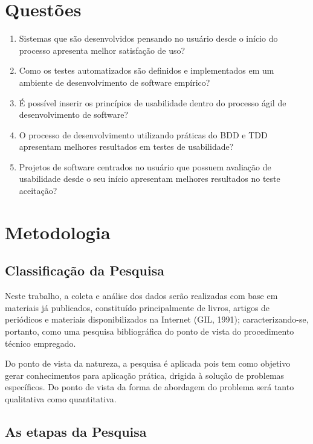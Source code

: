 	\section{Questões}
	\begin{enumerate}
	\item Sistemas que são desenvolvidos pensando no usuário desde o início do processo apresenta melhor  satisfação de uso?
	\item Como os testes automatizados são definidos e implementados em um ambiente de desenvolvimento de software empírico?
	\item É possível inserir os princípios de usabilidade dentro do processo ágil de desenvolvimento de software?
	\item O processo de desenvolvimento utilizando práticas do BDD e TDD apresentam melhores resultados em testes de usabilidade?
	\item Projetos de software centrados no usuário que possuem avaliação de usabilidade desde o seu início apresentam melhores resultados no teste aceitação?
	\end{enumerate}
	 


\section{Metodologia}

\subsection{Classificação da Pesquisa}

Neste trabalho, a coleta e análise dos dados serão realizadas com base em  materiais já publicados, constituído principalmente de livros, artigos de periódicos e  materiais disponibilizados na Internet (GIL, 1991); caracterizando-se, portanto, como uma pesquisa bibliográfica do ponto de vista do procedimento técnico empregado. 

Do ponto de vista da natureza, a pesquisa é aplicada pois tem como objetivo gerar conhecimentos para aplicação prática, drigida à solução de problemas específicos. Do ponto de vista da forma de abordagem do problema será tanto qualitativa como quantitativa.

\subsection{As etapas da Pesquisa}

